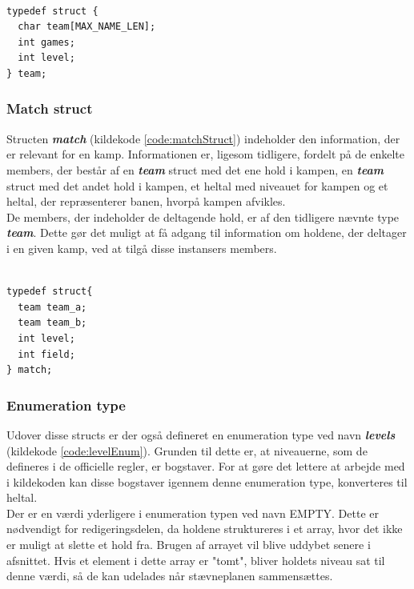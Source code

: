 \begin{listing}[H]
\begin{verbatim}

typedef struct {
  char team[MAX_NAME_LEN];
  int games;
  int level;
} team;

\end{verbatim}
\label{code:teamStruct}
\end{listing}

\subsubsection{Match struct}
Structen \textbf{\textit{match}} (kildekode \ref{code:matchStruct}) indeholder den information, der er relevant for en kamp. Informationen er, ligesom tidligere, fordelt på de enkelte members, der består af en \textbf{\textit{team}} struct med det ene hold i kampen, en \textbf{\textit{team}} struct med det andet hold i kampen, et heltal med niveauet for kampen og et heltal, der repræsenterer banen, hvorpå kampen afvikles. \\
De members, der indeholder de deltagende hold, er af den tidligere nævnte type \textbf{\textit{team}}. Dette gør det muligt at få adgang til information om holdene, der deltager i en given kamp, ved at tilgå disse instansers members.

\begin{listing} [H]
\begin{verbatim}

typedef struct{
  team team_a;
  team team_b;
  int level;
  int field;
} match;

\end{verbatim}
\label{code:matchStruct}
\end{listing}

\subsubsection{Enumeration type}
Udover disse structs er der også defineret en enumeration type ved navn \textbf{\textit{levels}} (kildekode \ref{code:levelEnum}). Grunden til dette er, at niveauerne, som de defineres i de officielle regler, er bogstaver. For at gøre det lettere at arbejde med i kildekoden kan disse bogstaver igennem denne enumeration type, konverteres til heltal. \\
Der er en værdi yderligere i enumeration typen ved navn EMPTY. Dette er nødvendigt for redigeringsdelen, da holdene struktureres i et array, hvor det ikke er muligt at slette et hold fra. Brugen af arrayet vil blive uddybet senere i afsnittet. Hvis et element i dette array er "tomt", bliver holdets niveau sat til denne værdi, så de kan udelades når stævneplanen sammensættes.

